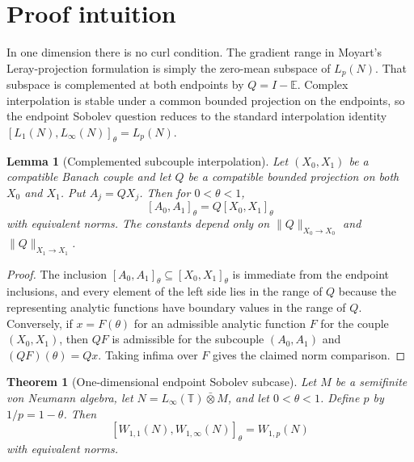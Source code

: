 \documentclass[11pt]{article}
\newtheorem{theorem}{Theorem}
\newtheorem{lemma}{Lemma}
\newcommand{\T}{\mathbb T}
\newcommand{\cb}{\bar\otimes}
\begin{document}
\section*{Proof intuition}

In one dimension there is no curl condition. The gradient range in Moyart's
Leray-projection formulation is simply the zero-mean subspace of $L_p(N)$.
That subspace is complemented at both endpoints by $Q=I-\mathbb E$. Complex
interpolation is stable under a common bounded projection on the endpoints, so
the endpoint Sobolev question reduces to the standard interpolation identity
$[L_1(N),L_\infty(N)]_\theta=L_p(N)$.

\begin{lemma}[Complemented subcouple interpolation]
Let $(X_0,X_1)$ be a compatible Banach couple and let $Q$ be a compatible
bounded projection on both $X_0$ and $X_1$. Put $A_j=QX_j$. Then for
$0<\theta<1$,
\[
  [A_0,A_1]_\theta = Q [X_0,X_1]_\theta
\]
with equivalent norms. The constants depend only on
$\|Q\|_{X_0\to X_0}$ and $\|Q\|_{X_1\to X_1}$.
\end{lemma}

\begin{proof}
The inclusion $[A_0,A_1]_\theta\subseteq [X_0,X_1]_\theta$ is immediate from
the endpoint inclusions, and every element of the left side lies in the range of
$Q$ because the representing analytic functions have boundary values in the
range of $Q$. Conversely, if $x=F(\theta)$ for an admissible analytic function
$F$ for the couple $(X_0,X_1)$, then $QF$ is admissible for the subcouple
$(A_0,A_1)$ and $(QF)(\theta)=Qx$. Taking infima over $F$ gives the claimed
norm comparison.
\end{proof}

\begin{theorem}[One-dimensional endpoint Sobolev subcase]
Let $M$ be a semifinite von Neumann algebra, let
$N=L_\infty(\T)\cb M$, and let $0<\theta<1$. Define $p$ by
$1/p=1-\theta$. Then
\[
  [W_{1,1}(N),W_{1,\infty}(N)]_\theta = W_{1,p}(N)
\]
with equivalent norms.
\end{theorem}
\end{document}
